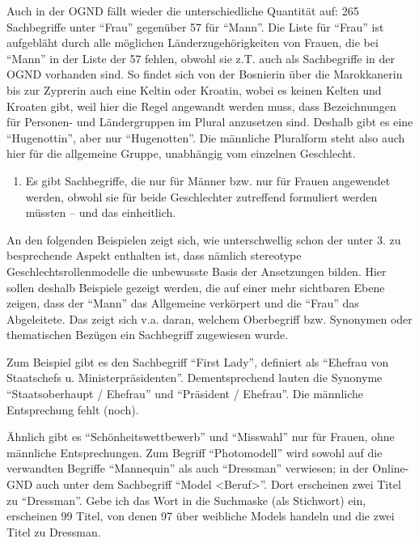 \documentclass[a4paper,
fontsize=11pt,
oneside,
numbers=noperiodatend,
parskip=half-,
bibliography=totoc,
final
]{scrartcl}
\begin{document}
Auch in der OGND fällt wieder die unterschiedliche Quantität auf: 265
Sachbegriffe unter \enquote{Frau} gegenüber 57 für \enquote{Mann}. Die
Liste für \enquote{Frau} ist aufgebläht durch alle möglichen
Länderzuge\-hörigkeiten von Frauen, die bei \enquote{Mann} in der Liste
der 57 fehlen, obwohl sie z.T. auch als Sachbegriffe in der OGND
vorhanden sind. So findet sich von der Bosnierin über die Marokkanerin
bis zur Zyprerin auch eine Keltin oder Kroatin, wobei es keinen Kelten
und Kroaten gibt, weil hier die Regel angewandt werden muss, dass
Bezeichnungen für Personen- und Ländergruppen im Plural anzusetzen sind.
Deshalb gibt es eine \enquote{Hugenottin}, aber nur
\enquote{Hugenotten}. Die männliche Pluralform steht also auch hier für
die allgemeine Gruppe, unabhängig vom einzelnen Geschlecht.

\begin{enumerate}
\def\labelenumi{\arabic{enumi}.}
\setcounter{enumi}{1}
\itemsep1pt\parskip0pt
\item
  Es gibt Sachbegriffe, die nur für Männer bzw. nur für Frauen
  angewendet werden, obwohl sie für beide Geschlechter zutreffend
  formuliert werden müssten -- und das einheitlich.
\end{enumerate}

An den folgenden Beispielen zeigt sich, wie unterschwellig schon der
unter 3. zu besprechende Aspekt enthalten ist, dass nämlich stereotype
Geschlechtsrollenmodelle die unbewusste Basis der Ansetzungen bilden.
Hier sollen deshalb Beispiele gezeigt werden, die auf einer mehr
sichtbaren Ebene zeigen, dass der \enquote{Mann} das Allgemeine
verkörpert und die \enquote{Frau} das Abgeleitete. Das zeigt sich v.a.
daran, welchem Oberbegriff bzw. Synonymen oder thematischen Bezügen ein
Sachbegriff zugewiesen wurde.

Zum Beispiel gibt es den Sachbegriff \enquote{First Lady}, definiert als
\enquote{Ehefrau von Staatschefs u. Ministerpräsidenten}.
Dementsprechend lauten die Synonyme \enquote{Staatsoberhaupt / Ehefrau}
und \enquote{Präsident / Ehefrau}. Die männliche Entsprechung fehlt
(noch).

Ähnlich gibt es \enquote{Schönheitswettbewerb} und \enquote{Misswahl}
nur für Frauen, ohne männliche Entsprechungen. Zum Begriff
\enquote{Photomodell} wird sowohl auf die verwandten Begriffe
\enquote{Mannequin} als auch \enquote{Dressman} verwiesen; in der
Online-GND auch unter dem Sachbegriff \enquote{Model
\textless{}Beruf\textgreater{}}. Dort erscheinen zwei Titel zu
\enquote{Dressman}. Gebe ich das Wort in die Suchmaske (als Stichwort)
ein, erscheinen 99 Titel, von denen 97 über weibliche Models handeln und
die zwei Titel zu Dressman.
\end{document}
